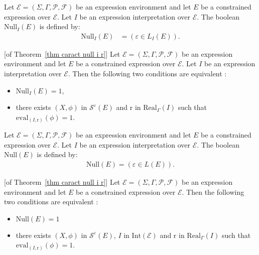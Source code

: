 \documentclass[a4paper]{llncs}
\begin{document}
  
 
  \begin{definition}
    Let $\mathcal{E}=(\Sigma,\Gamma,\mathcal{P},\mathcal{F})$ be an expression environment and let $E$ be a constrained expression over $\mathcal{E}$. Let $I$ be  an expression interpretation over $\mathcal{E}$. The boolean $\mathrm{Null}_{I}(E)$ is defined by:
        \begin{align*}
       \mathrm{Null}_{I}(E)&=(\varepsilon\in L_{I}(E)).
        \end{align*}
  \end{definition}
  
  \begin{corollary}\label{cor nullIE lien sat}[of Theorem~\ref{thm caract null i r}]
    Let $\mathcal{E}=(\Sigma,\Gamma,\mathcal{P},\mathcal{F})$ be an expression environment and let $E$ be a constrained expression over $\mathcal{E}$. Let $I$ be  an expression interpretation over $\mathcal{E}$. Then the  following two conditions are equivalent :
    \begin{itemize}
        \item $\mathrm{Null}_{I}(E)=1$,
        \item there exists $(X,\phi)$ in $\mathcal{S}^{\varepsilon}(E)$ and $\mathrm{r}$ in $\mathrm{Real}_\Gamma(I)$ such that $\mathrm{eval}_{(I,\mathrm{r})}(\phi)=1$.
     \end{itemize}
  \end{corollary}
  
 
  
  \begin{definition}
    Let $\mathcal{E}=(\Sigma,\Gamma,\mathcal{P},\mathcal{F})$ be an expression environment and let $E$ be a constrained expression over $\mathcal{E}$. Let $I$ be  an expression interpretation over $\mathcal{E}$. The boolean $\mathrm{Null}(E)$ is defined by:
        \begin{align*}
       \mathrm{Null}(E)=(\varepsilon\in L(E)).
        \end{align*}
  \end{definition}
  
  \begin{corollary}\label{cor nullE lien sat}[of Theorem~\ref{thm caract null i r}]
    Let $\mathcal{E}=(\Sigma,\Gamma,\mathcal{P},\mathcal{F})$ be an expression environment and let $E$ be a constrained expression over $\mathcal{E}$. Then the  following two conditions are equivalent :
    \begin{itemize}
        \item $\mathrm{Null}(E)=1$
        \item there exists $(X,\phi)$ in $\mathcal{S}^{\varepsilon}(E)$, $I$ in $\mathrm{Int}(\mathcal{E})$ and $\mathrm{r}$ in $\mathrm{Real}_\Gamma(I)$ such that $\mathrm{eval}_{(I,\mathrm{r})}(\phi)=1$.
     \end{itemize}
  \end{corollary}
  
\end{document}
